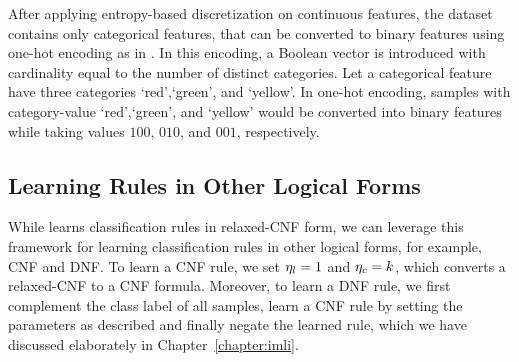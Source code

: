 After applying entropy-based discretization on continuous features,  the dataset  contains only categorical features, that can be converted to binary features using one-hot encoding as in \cite{LKCL2019}. In this encoding, a Boolean vector is introduced with cardinality equal to the number of distinct categories. Let a categorical feature have three  categories `red',`green', and `yellow'. In one-hot encoding, samples with category-value `red',`green', and `yellow' would be converted into binary features while taking values $ 100 $, $ 010 $, and $ 001 $, respectively. 


\subsection{Learning Rules in Other Logical Forms}
\label{interpretability_crr_sec:other_rules}
While {\crr} learns  classification rules in relaxed-CNF form, we can leverage this framework for learning classification rules in other logical forms, for example, CNF and  DNF. To learn a CNF rule, we set  $ \eta_l=1 $ and $ \eta_c=k $, which converts a relaxed-CNF to a CNF formula. Moreover,  to learn a DNF rule,  we first complement the class label of all samples, learn a CNF rule by setting the parameters as described and finally negate the learned rule, which we have discussed elaborately in Chapter~\ref{chapter:imli}.






